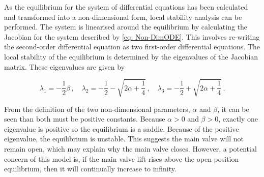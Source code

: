 



As the equilibrium for the system of differential equations has been calculated and transformed into a non-dimensional form, local stability analysis can be performed. The system is linearised around the equilibrium by calculating the Jacobian for the system described by \cref{eq: Non-DimODE}. This involves re-writing the second-order differential equation as two first-order differential equations. The local stability of the equilibrium is determined by the eigenvalues of the Jacobian matrix. These eigenvalues are given by

\begin{equation*}
\lambda_1 = - \frac{1}{2} \beta \, , \quad
\lambda_2 = - \frac{1}{2} - \sqrt{2 \alpha + \frac{1}{4}} \, , \quad \lambda_3 = - \frac{1}{2} + \sqrt{2 \alpha + \frac{1}{4}} \, .
\end{equation*}

From the definition of the two non-dimensional parameters, $\alpha$ and $\beta$, it can be seen than both must be positive constants. Because $\alpha > 0$ and $\beta > 0$, exactly one eigenvalue is positive so the equilibrium is a saddle. Because of the positive eigenvalue, the equilibrium is unstable. This suggests the main valve will not remain open, which may explain why the main valve closes. However, a potential concern of this model is, if the main valve lift rises above the open position equilibrium, then it will continually increase to infinity.

